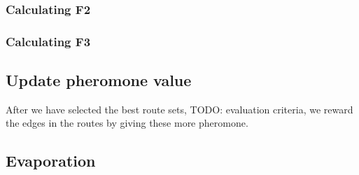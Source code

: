 
\subsubsection{Calculating F2}
\subsubsection{Calculating F3}

\subsection{Update pheromone value}

\begin{algorithm}[H]
\end{algorithm}

After we have selected the best route sets, TODO: evaluation criteria, we reward the edges in the routes by giving these more pheromone.


\subsection{Evaporation}

\begin{algorithm}[H]
\end{algorithm}



